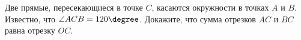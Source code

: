 \begin{ex}
	\begin{condition}
		Две прямые, пересекающиеся в точке \( C \), касаются окружности в точках \( A \) и \( B \). Известно, что \( \angle ACB = 120\degree \). Докажите, что сумма отрезков \( AC \) и \( BC \) равна отрезку \( OC \).
	\end{condition}
\end{ex}